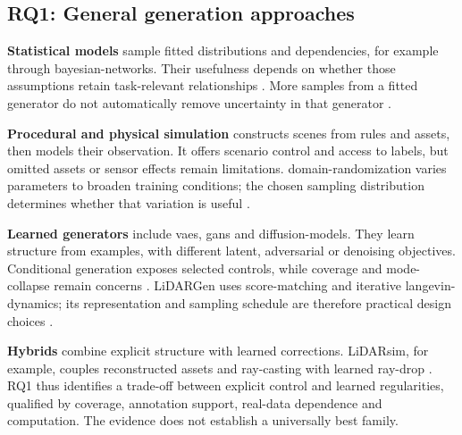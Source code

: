 \subsection{RQ1: General generation approaches}
\label{sec:rq1}
\textbf{Statistical models} sample fitted distributions and dependencies,
for example through \glspl{bayesian-network}. Their usefulness depends on
whether those assumptions retain task-relevant relationships
\parencite{hernandezSyntheticDataGeneration2022,hansenReimaginingSyntheticTabular2023}.
More samples from a fitted generator do not automatically remove uncertainty
in that generator \parencite{breugelSyntheticDataReal2023}.

\textbf{Procedural and physical simulation} constructs scenes from rules
and assets, then models their observation. It offers scenario control and
access to labels, but omitted assets or sensor effects remain limitations.
\Gls{domain-randomization} varies parameters to broaden training conditions;
the chosen sampling distribution determines whether that variation is useful
\parencite{nikolenkoSyntheticDataDeep2019}.

\textbf{Learned generators} include \glspl{vae}, \glspl{gan} and
\glspl{diffusion-model}. They learn structure from examples, with different
latent, adversarial or denoising objectives. Conditional generation exposes
selected controls, while coverage and \gls{mode-collapse} remain concerns
\parencite{hernandezSyntheticDataGeneration2022,hansenReimaginingSyntheticTabular2023}.
LiDARGen uses \gls{score-matching} and iterative
\gls{langevin-dynamics}; its representation and sampling schedule are
therefore practical design choices
\parencite{zyrianovLearningGenerateRealistic2022}.

\textbf{Hybrids} combine explicit structure with learned corrections.
LiDARsim, for example, couples reconstructed assets and \gls{ray-casting}
with learned \gls{ray-drop}
\parencite{manivasagamLiDARsimRealisticLiDAR2020a}.
RQ1 thus identifies a trade-off between explicit control and learned
regularities, qualified by coverage, annotation support, real-data dependence
and computation. The evidence does not establish a universally best family.
